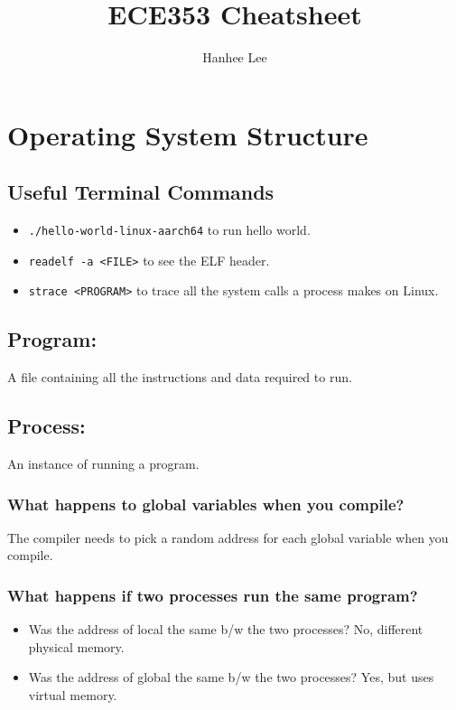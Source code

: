 \documentclass[twoside]{article}
\title{ECE353 Cheatsheet}
\author{Hanhee Lee}
\begin{document}
\maketitle

\section{Operating System Structure}
\subsection{Useful Terminal Commands}
\begin{summary}
    \begin{itemize}
        \item \texttt{./hello-world-linux-aarch64} to run hello world.
        \item \texttt{readelf -a <FILE>} to see the ELF header.
        \item \texttt{strace <PROGRAM>} to trace all the system calls a process makes on Linux.
    \end{itemize}
\end{summary}
\subsection{Program:}
\begin{definition}
    A file containing all the instructions and data required to run.
\end{definition}

\subsection{Process:}
\begin{definition}
    An instance of running a program.
\end{definition}

\subsubsection{What happens to global variables when you compile?}
\begin{definition}
    The compiler needs to pick a random address for each global variable when you compile.
\end{definition}

\subsubsection{What happens if two processes run the same program?}
\begin{definition}
    \begin{itemize}
        \item Was the address of local the same b/w the two processes? No, different physical memory.
        \item Was the address of global the same b/w the two processes? Yes, but uses virtual memory.
    \end{itemize}
\end{definition}
\end{document}
